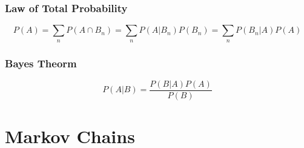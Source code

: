 \documentclass{article}
\begin{document}
    \subsubsection{Law of Total Probability}
    \begin{equation}
        P(A) = \sum_n P(A \cap B_n) = \sum_n P(A | B_n)P(B_n) = \sum_n P(B_n | A)P(A)
    \end{equation}

    \subsubsection{Bayes Theorm}
    \begin{equation}
        P(A | B) = \frac {P(B | A)P(A)} { P(B) }
    \end{equation}

    \section{Markov Chains}
\end{document}
